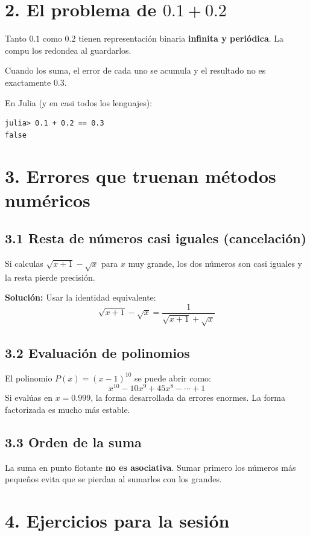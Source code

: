 \documentclass[12pt,letterpaper]{article}
\begin{document}
\section*{2. El problema de $0.1 + 0.2$}

Tanto $0.1$ como $0.2$ tienen representación binaria \textbf{infinita y periódica}. La compu los redondea al guardarlos.

Cuando los suma, el error de cada uno se acumula y el resultado no es exactamente $0.3$.

En Julia (y en casi todos los lenguajes):
\begin{verbatim}
julia> 0.1 + 0.2 == 0.3
false
\end{verbatim}

\section*{3. Errores que truenan métodos numéricos}

\subsection*{3.1 Resta de números casi iguales (cancelación)}
Si calculas $\sqrt{x+1} - \sqrt{x}$ para $x$ muy grande, los dos números son casi iguales y la resta pierde precisión.

\textbf{Solución:} Usar la identidad equivalente:
\[
\sqrt{x+1} - \sqrt{x} = \frac{1}{\sqrt{x+1} + \sqrt{x}}
\]

\subsection*{3.2 Evaluación de polinomios}
El polinomio $P(x) = (x-1)^{10}$ se puede abrir como:
\[
x^{10} - 10x^9 + 45x^8 - \cdots + 1
\]
Si evalúas en $x = 0.999$, la forma desarrollada da errores enormes. La forma factorizada es mucho más estable.

\subsection*{3.3 Orden de la suma}
La suma en punto flotante \textbf{no es asociativa}. Sumar primero los números más pequeños evita que se pierdan al sumarlos con los grandes.

\section*{4. Ejercicios para la sesión}
\end{document}
